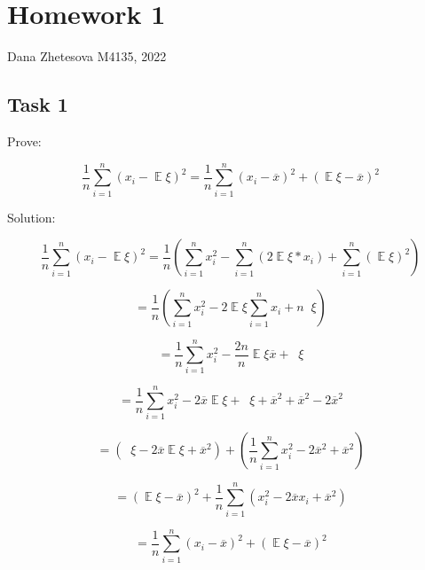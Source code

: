 \documentclass[a4paper,12pt,oneside,article]{memoir}
\begin{document}
\chapter*{Homework 1}
Dana Zhetesova M4135, 2022

\section*{Task 1}
Prove:

\begin{equation*}
	\frac{1}{n}\sum_{i=1}^n (x_i - \mathop{\mathbb{E}}\xi)^2 = \frac{1}{n}\sum_{i=1}^n (x_i - \overline{x})^2 +(\mathop{\mathbb{E}}\xi - \overline{x})^2
\end{equation*}

Solution:

\begin{equation*}
    \frac{1}{n}\sum_{i=1}^n (x_i - \mathop{\mathbb{E}}\xi)^2 = \frac{1}{n}(\sum_{i=1}^n x_i^2 - \sum_{i=1}^n (2 \mathop{\mathbb{E}}\xi * x_i) + \sum_{i=1}^n(\mathop{\mathbb{E}}\xi)^2)
\end{equation*}

\begin{equation*}
    = \frac{1}{n}(\sum_{i=1}^n x_i^2 - 2\mathop{\mathbb{E}}\xi\sum_{i=1}^n x_i + n\mathop{\mathbb{E}^2}\xi)
\end{equation*}

\begin{equation*}
    = \frac{1}{n}\sum_{i=1}^n x_i^2 - \frac{2n}{n}\mathop{\mathbb{E}}\xi\overline{x} + \mathop{\mathbb{E}^2}\xi
\end{equation*}

\begin{equation*}
    = \frac{1}{n}\sum_{i=1}^n x_i^2 - 2\overline{x}\mathop{\mathbb{E}}\xi + \mathop{\mathbb{E}^2}\xi + \overline{x}^2 + \overline{x}^2 - 2\overline{x}^2
\end{equation*}

\begin{equation*}
    = (\mathop{\mathbb{E}^2}\xi - 2\overline{x}\mathop{\mathbb{E}}\xi + \overline{x}^2) + (\frac{1}{n}\sum_{i=1}^n x_i^2 - 2\overline{x}^2 + \overline{x}^2)
\end{equation*}

\begin{equation*}
    = (\mathop{\mathbb{E}}\xi - \overline{x})^2 + \frac{1}{n}\sum_{i=1}^n (x_i^2 - 2\overline{x}x_i + \overline{x}^2)
\end{equation*}

\begin{equation*}
    = \frac{1}{n}\sum_{i=1}^n (x_i - \overline{x})^2 + (\mathop{\mathbb{E}}\xi - \overline{x})^2
\end{equation*}
\end{document}
